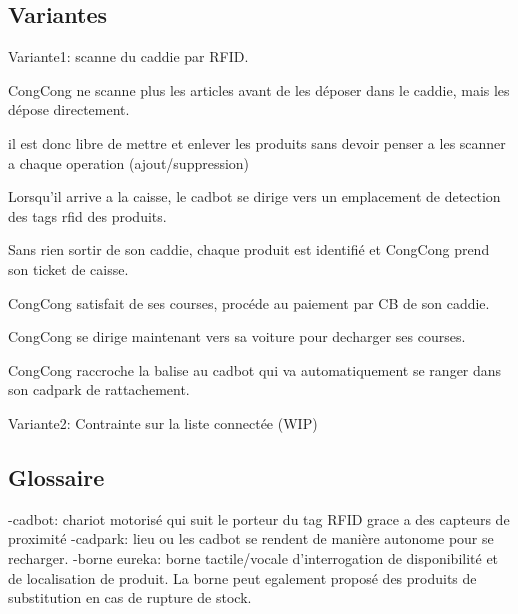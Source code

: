 \par


\par

\subsection{Variantes}

Variante1: scanne du caddie par RFID.

\startitemize
\item CongCong ne scanne plus les articles avant de les déposer dans le caddie, mais les dépose directement.
\item il est donc libre de mettre et enlever les produits sans devoir penser a les scanner a chaque operation (ajout/suppression)
\item Lorsqu'il arrive a la caisse, le cadbot se dirige vers un emplacement de detection des tags rfid des produits.
\item Sans rien sortir de son caddie, chaque produit est identifié et CongCong prend son ticket de caisse.
\item CongCong satisfait de ses courses, procéde au paiement par CB de son caddie.
\item CongCong se dirige maintenant vers sa voiture pour decharger ses courses.
\item CongCong raccroche la balise au cadbot qui va automatiquement se ranger dans son cadpark de rattachement.
\stopitemize

\par

\par
Variante2: Contrainte sur la liste connectée (WIP)



\par


\par
\subsection{Glossaire}
 -cadbot: chariot motorisé qui suit le porteur du tag RFID grace a des capteurs de proximité
 -cadpark: lieu ou les cadbot se rendent de manière autonome pour se recharger.
 -borne eureka: borne tactile/vocale d'interrogation de disponibilité et de localisation de produit.
 La borne peut egalement proposé des produits de substitution en cas de rupture de stock.
  \par
